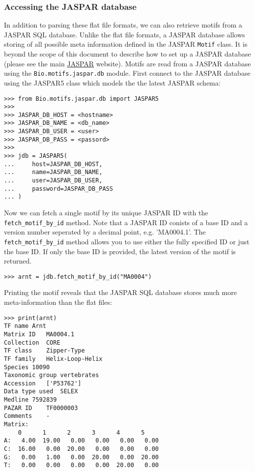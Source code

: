\subsubsection*{Accessing the JASPAR database}

In addition to parsing these flat file formats, we can also retrieve motifs from a JASPAR SQL database. Unlike the flat file formats, a JASPAR database allows storing of all possible meta information defined in the JASPAR \verb+Motif+ class. It is beyond the scope of this document to describe how to set up a JASPAR database (please see the main \href{http://jaspar.genereg.net}{JASPAR} website). Motifs are read from a JASPAR database using the \verb+Bio.motifs.jaspar.db+ module.  First connect to the JASPAR database using the JASPAR5 class which models the the latest JASPAR schema:
\begin{verbatim}
>>> from Bio.motifs.jaspar.db import JASPAR5
>>>
>>> JASPAR_DB_HOST = <hostname>
>>> JASPAR_DB_NAME = <db_name>
>>> JASPAR_DB_USER = <user>
>>> JASPAR_DB_PASS = <passord>
>>>
>>> jdb = JASPAR5(
...     host=JASPAR_DB_HOST,
...     name=JASPAR_DB_NAME,
...     user=JASPAR_DB_USER,
...     password=JASPAR_DB_PASS
... )
\end{verbatim}

Now we can fetch a single motif by its unique JASPAR ID with the \verb+fetch_motif_by_id+ method. Note that a JASPAR ID conists of a base ID and a version number seperated by a decimal point, e.g. 'MA0004.1'. The \verb+fetch_motif_by_id+ method allows you to use either the fully specified ID or just the base ID. If only the base ID is provided, the latest version of the motif is returned.
\begin{verbatim}
>>> arnt = jdb.fetch_motif_by_id("MA0004")
\end{verbatim}
Printing the motif reveals that the JASPAR SQL database stores much more meta-information than the flat files:
\begin{verbatim}
>>> print(arnt)
TF name	Arnt
Matrix ID	MA0004.1
Collection	CORE
TF class	Zipper-Type
TF family	Helix-Loop-Helix
Species	10090
Taxonomic group	vertebrates
Accession	['P53762']
Data type used	SELEX
Medline	7592839
PAZAR ID	TF0000003
Comments	-
Matrix:
	0      1      2      3      4      5
A:   4.00  19.00   0.00   0.00   0.00   0.00
C:  16.00   0.00  20.00   0.00   0.00   0.00
G:   0.00   1.00   0.00  20.00   0.00  20.00
T:   0.00   0.00   0.00   0.00  20.00   0.00


\end{verbatim}

